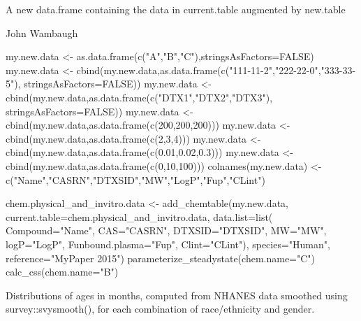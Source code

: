 \documentclass[a4paper]{book}
\begin{document}
%
\begin{Value}
\begin{ldescription}
\item[\code{data.frame}] A new data.frame containing the data in
current.table augmented by new.table
\end{ldescription}
\end{Value}
%
\begin{Author}\relax
John Wambaugh
\end{Author}
%
\begin{Examples}
\begin{ExampleCode}


my.new.data <- as.data.frame(c("A","B","C"),stringsAsFactors=FALSE)
my.new.data <- cbind(my.new.data,as.data.frame(c("111-11-2","222-22-0","333-33-5"),
                     stringsAsFactors=FALSE))
my.new.data <- cbind(my.new.data,as.data.frame(c("DTX1","DTX2","DTX3"),
                    stringsAsFactors=FALSE))
my.new.data <- cbind(my.new.data,as.data.frame(c(200,200,200)))
my.new.data <- cbind(my.new.data,as.data.frame(c(2,3,4)))
my.new.data <- cbind(my.new.data,as.data.frame(c(0.01,0.02,0.3)))
my.new.data <- cbind(my.new.data,as.data.frame(c(0,10,100)))
colnames(my.new.data) <- c("Name","CASRN","DTXSID","MW","LogP","Fup","CLint")

chem.physical_and_invitro.data <- add_chemtable(my.new.data,
                                  current.table=chem.physical_and_invitro.data,
                                  data.list=list(
                                  Compound="Name",
                                  CAS="CASRN",
                                  DTXSID="DTXSID",
                                  MW="MW",
                                  logP="LogP",
                                  Funbound.plasma="Fup",
                                  Clint="CLint"),
                                  species="Human",
                                  reference="MyPaper 2015")
parameterize_steadystate(chem.name="C")  
calc_css(chem.name="B")                                


\end{ExampleCode}
\end{Examples}
%
\begin{Description}\relax
Distributions of ages in months, computed from NHANES data smoothed using
survey::svysmooth(), for each combination of race/ethnicity and gender.
\end{Description}
\end{document}
